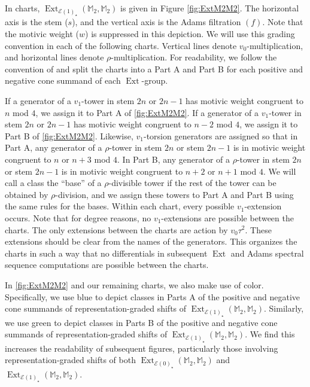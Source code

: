 \documentclass{amsart}
\theoremstyle{plain}
\numberwithin{equation}{section}
\numberwithin{figure}{section}
\DeclareMathOperator{\Ext}{Ext}
\newcommand{\mM}{{\mathbb M}}
\newcommand{\cE}{{\mathcal E}}
\newcommand{\0}{\langle 0 \rangle }
\begin{document}
In charts, $\Ext_{\cE(1)_\star} (\mM_2, \mM_2)$ is given in Figure \ref{fig:ExtM2M2}. The horizontal axis is the stem ($s$), and the vertical axis is the Adams filtration $(f)$. Note that the motivic weight ($w$) is suppressed in this depiction. We will use this grading convention in each of the following charts. Vertical lines denote $v_{0}$-multiplication, and horizontal lines denote $\rho$-multiplication. For readability, we follow the convention of \cite{GuillouHillIsaksenRavenel2020} and split the charts into a Part A and Part B for each positive and negative cone summand of each $\Ext$-group. 

If a generator of a $v_{1}$-tower in stem $2n$ or $2n-1$ has motivic weight congruent to $n$ mod $4$, we assign it to Part A of \cref{fig:ExtM2M2}. If a generator of a $v_{1}$-tower in stem $2n$ or $2n-1$ has motivic weight congruent to $n-2$ mod $4$, we assign it to Part B of \cref{fig:ExtM2M2}. Likewise, $v_{1}$-torsion generators are assigned so that in Part A, any generator of a $\rho$-tower in stem $2n$ or stem $2n-1$ is in motivic weight congruent to $n$ or $n+3$ mod $4$. In Part B, any generator of a $\rho$-tower in stem $2n$ or stem $2n-1$ is in motivic weight congruent to $n+2$ or $n+1$ mod $4$. We will call a class the ``base'' of a $\rho$-divisible tower if the rest of the tower can be obtained by $\rho$-division, and we assign these towers to Part A and Part B using the same rules for the bases. Within each chart, every possible $v_1$-extension occurs. Note that for degree reasons, no $v_{1}$-extensions are possible between the charts. The only extensions between the charts are action by $v_{0}\tau^{2}$. These extensions should be clear from the names of the generators. This organizes the charts in such a way that no differentials in subsequent $\Ext$ and Adams spectral sequence computations are possible between the charts. 

In \cref{fig:ExtM2M2} and our remaining charts, we also make use of color. Specifically, we use blue to depict classes in Parts A of the positive and negative cone summands of representation-graded shifts of $\Ext_{\cE(1)_\star}(\mM_2, \mM_2)$. Similarly, we use green to depict classes in Parts B of the positive and negative cone summands of representation-graded shifts of $\Ext_{\cE(1)_\star}(\mM_2, \mM_2)$. We find this increases the readability of subsequent figures, particularly those involving representation-graded shifts of both $\Ext_{\cE(0)_\star}(\mM_2, \mM_2)$ and $\Ext_{\cE(1)_\star}(\mM_2, \mM_2)$. 
\end{document}
